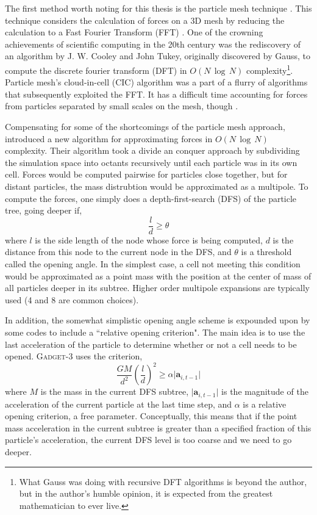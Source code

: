 The first method worth noting for this thesis is the particle mesh technique \citep{hockney_pm, white_pm, klypin_pm}. This technique considers the calculation of forces on a 3D mesh by reducing the calculation to a Fast Fourier Transform (FFT) \citep{numerical_recipes_fortran}. One of the crowning achievements of scientific computing in the 20th century was the rediscovery of an algorithm by J. W. Cooley and John Tukey, originally discovered by Gauss, to compute the discrete fourier transform (DFT) in $O(N\,\log\,N)$ complexity\footnote{What Gauss was doing with recursive DFT algorithms is beyond the author, but in the author's humble opinion, it is expected from the greatest mathematician to ever live.}\citep{fft}. Particle mesh's cloud-in-cell (CIC) algorithm was a part of a flurry of algorithms that subsequently exploited the FFT. It has a difficult time accounting for forces from particles separated by small scales on the mesh, though \citep{GadgetCodePaper}.

Compensating for some of the shortcomings of the particle mesh approach, \citet{barnes_hut} introduced a new algorithm for approximating forces in $O(N \,\log\, N)$ complexity. Their algorithm took a divide an conquer approach by subdividing the simulation space into octants recursively until each particle was in its own cell. Forces would be computed pairwise for particles close together, but for distant particles, the mass distrubtion would be approximated as a multipole. To compute the forces, one simply does a depth-first-search (DFS) of the particle tree, going deeper if,
\begin{equation}
\frac{l}{d} \geq \theta
\end{equation}
where $l$ is the side length of the node whose force is being computed, $d$ is the distance from this node to the current node in the DFS, and $\theta$ is a threshold called the opening angle. In the simplest case, a cell not meeting this condition would be approximated as a point mass with the position at the  center of mass of all particles deeper in its subtree. Higher order multipole expansions are typically used (4 and 8 are common choices).

In addition, the somewhat simplistic opening angle scheme is expounded upon by some codes to include a ``relative opening criterion". The main idea is to use the last acceleration of the particle to determine whether or not a cell needs to be opened. \textsc{Gadget-3} uses the criterion,
\begin{equation}
\frac{G M}{d^2} \left(\frac{l}{d}\right)^2 \geq \alpha \vert\textbf{a}_{i,t-1} \vert
\end{equation}
where $M$ is the mass in the current DFS subtree, $\vert\textbf{a}_{i,t-1} \vert$ is the magnitude of the acceleration of the current particle at the last time step, and $\alpha$ is a relative opening criterion, a free parameter. Conceptually, this means that if the point mass acceleration in the current subtree is greater than a specified fraction of this particle's acceleration, the current DFS level is too coarse and we need to go deeper.

